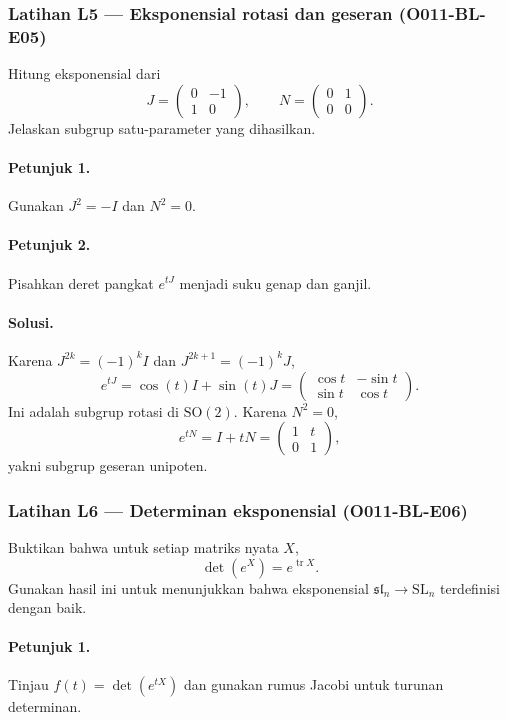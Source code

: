 \subsubsection*{Latihan L5 — Eksponensial rotasi dan geseran (O011-BL-E05)}
\label{o011-bl-e05}

Hitung eksponensial dari
\[
 J=\begin{pmatrix}0&-1\\1&0\end{pmatrix},
 \qquad
 N=\begin{pmatrix}0&1\\0&0\end{pmatrix}.
\]
Jelaskan subgrup satu-parameter yang dihasilkan.

\paragraph{Petunjuk 1.}
Gunakan $J^2=-I$ dan $N^2=0$.

\paragraph{Petunjuk 2.}
Pisahkan deret pangkat $e^{tJ}$ menjadi suku genap dan ganjil.

\paragraph{Solusi.}
Karena $J^{2k}=(-1)^kI$ dan $J^{2k+1}=(-1)^kJ$,
\[
 e^{tJ}=\cos(t)I+\sin(t)J
 =\begin{pmatrix}\cos t&-\sin t\\\sin t&\cos t\end{pmatrix}.
\]
Ini adalah subgrup rotasi di $\mathrm{SO}(2)$. Karena $N^2=0$,
\[
 e^{tN}=I+tN=\begin{pmatrix}1&t\\0&1\end{pmatrix},
\]
yakni subgrup geseran unipoten.

\subsubsection*{Latihan L6 — Determinan eksponensial (O011-BL-E06)}
\label{o011-bl-e06}

Buktikan bahwa untuk setiap matriks nyata $X$,
\[
  \det(e^X)=e^{\operatorname{tr}X}.
\]
Gunakan hasil ini untuk menunjukkan bahwa eksponensial
$\mathfrak{sl}_n\to\mathrm{SL}_n$ terdefinisi dengan baik.

\paragraph{Petunjuk 1.}
Tinjau $f(t)=\det(e^{tX})$ dan gunakan rumus Jacobi untuk turunan determinan.

